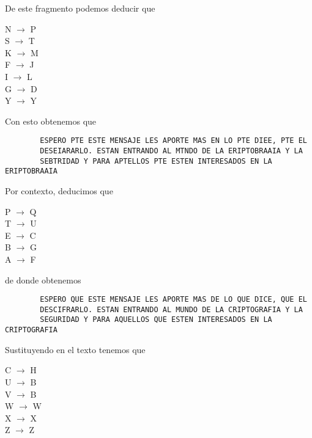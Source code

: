 \documentclass[letterpaper,11pt]{article}
\begin{document}
\begin{enumerate}
\begin{enumerate}
        \newpage
        De este fragmento podemos deducir que 
        \begin{center}
            N $\rightarrow$ P \\
            S $\rightarrow$ T \\
            K $\rightarrow$ M \\
            F $\rightarrow$ J \\
            I $\rightarrow$ L \\
            G $\rightarrow$ D \\
            Y $\rightarrow$ Y
        \end{center}
        
        Con esto obtenemos que 
        \begin{verbatim}
        ESPERO PTE ESTE MENSAJE LES APORTE MAS EN LO PTE DIEE, PTE EL
        DESEIARARLO. ESTAN ENTRANDO AL MTNDO DE LA ERIPTOBRAAIA Y LA
        SEBTRIDAD Y PARA APTELLOS PTE ESTEN INTERESADOS EN LA ERIPTOBRAAIA
        \end{verbatim}
        
        Por contexto, deducimos que 
        \begin{center}
            P $\rightarrow$ Q \\
            T $\rightarrow$ U \\
            E $\rightarrow$ C \\
            B $\rightarrow$ G \\
            A $\rightarrow$ F
        \end{center}
        
        de donde obtenemos
        \begin{verbatim}
        ESPERO QUE ESTE MENSAJE LES APORTE MAS DE LO QUE DICE, QUE EL
        DESCIFRARLO. ESTAN ENTRANDO AL MUNDO DE LA CRIPTOGRAFIA Y LA
        SEGURIDAD Y PARA AQUELLOS QUE ESTEN INTERESADOS EN LA CRIPTOGRAFIA
        \end{verbatim}
        
        Sustituyendo en el texto tenemos que 
        \begin{center}
            C $\rightarrow$ H \\
            U $\rightarrow$ B \\
            V $\rightarrow$ B \\
            W $\rightarrow$ W \\
            X $\rightarrow$ X \\
            Z $\rightarrow$ Z
        \end{center}


\end{enumerate}
\end{enumerate}
\end{document}
